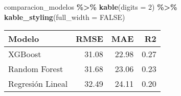 \documentclass[
]{article}
\newenvironment{Shaded}{\begin{snugshade}}{\end{snugshade}}
\newcommand{\AttributeTok}[1]{\textcolor[rgb]{0.13,0.29,0.53}{#1}}
\newcommand{\ConstantTok}[1]{\textcolor[rgb]{0.56,0.35,0.01}{#1}}
\newcommand{\DecValTok}[1]{\textcolor[rgb]{0.00,0.00,0.81}{#1}}
\newcommand{\FunctionTok}[1]{\textcolor[rgb]{0.13,0.29,0.53}{\textbf{#1}}}
\newcommand{\NormalTok}[1]{#1}
\newcommand{\SpecialCharTok}[1]{\textcolor[rgb]{0.81,0.36,0.00}{\textbf{#1}}}
\begin{document}
\begin{Shaded}
\begin{Highlighting}[]
\NormalTok{comparacion\_modelos }\SpecialCharTok{\%\textgreater{}\%}
  \FunctionTok{kable}\NormalTok{(}\AttributeTok{digits =} \DecValTok{2}\NormalTok{) }\SpecialCharTok{\%\textgreater{}\%}
  \FunctionTok{kable\_styling}\NormalTok{(}\AttributeTok{full\_width =} \ConstantTok{FALSE}\NormalTok{)}
\end{Highlighting}
\end{Shaded}

\begin{longtable}[t]{lrrr}
\toprule
Modelo & RMSE & MAE & R2\\
\midrule
XGBoost & 31.08 & 22.98 & 0.27\\
Random Forest & 31.68 & 23.06 & 0.23\\
Regresión Lineal & 32.49 & 24.11 & 0.20\\
\bottomrule
\end{longtable}
\end{document}
